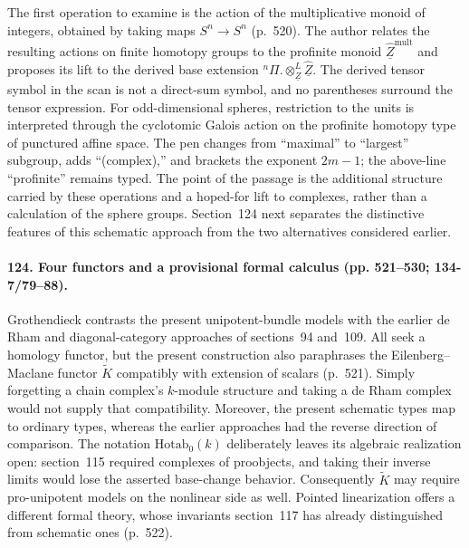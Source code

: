 The first operation to examine is the action of the multiplicative monoid of integers, obtained by taking maps $S^n\to S^n$ (p.~520). The author relates the resulting actions on finite homotopy groups to the profinite monoid $\widehat{\underline Z}^{\mathrm{mult}}$ and proposes its lift to the derived base extension ${}^n\Pi.\otimes^{L}_{\underline Z}\widehat{\underline Z}$. The derived tensor symbol in the scan is not a direct-sum symbol, and no parentheses surround the tensor expression. For odd-dimensional spheres, restriction to the units is interpreted through the cyclotomic Galois action on the profinite homotopy type of punctured affine space. The pen changes from ``maximal'' to ``largest'' subgroup, adds ``(complex),'' and brackets the exponent $2m-1$; the above-line ``profinite'' remains typed. The point of the passage is the additional structure carried by these operations and a hoped-for lift to complexes, rather than a calculation of the sphere groups. Section~124 next separates the distinctive features of this schematic approach from the two alternatives considered earlier.

\paragraph{124. Four functors and a provisional formal calculus (pp. 521--530; 134-7/79--88).}
Grothendieck contrasts the present unipotent-bundle models with the earlier de Rham and diagonal-category approaches of sections~94 and~109. All seek a homology functor, but the present construction also paraphrases the Eilenberg--Maclane functor $\widetilde K$ compatibly with extension of scalars (p.~521). Simply forgetting a chain complex's $k$-module structure and taking a de Rham complex would not supply that compatibility. Moreover, the present schematic types map to ordinary types, whereas the earlier approaches had the reverse direction of comparison. The notation $\mathrm{Hotab}_0(k)$ deliberately leaves its algebraic realization open: section~115 required complexes of proobjects, and taking their inverse limits would lose the asserted base-change behavior. Consequently $\widetilde K$ may require pro-unipotent models on the nonlinear side as well. Pointed linearization offers a different formal theory, whose invariants section~117 has already distinguished from schematic ones (p.~522).

